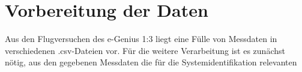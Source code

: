\chapter{Vorbereitung der Daten}

Aus den Flugversuchen des e-Genius 1:3 liegt eine Fülle von Messdaten in verschiedenen .csv-Dateien vor. Für die weitere 
Verarbeitung ist es zunächst nötig, aus den gegebenen Messdaten die für die Systemidentifikation relevanten